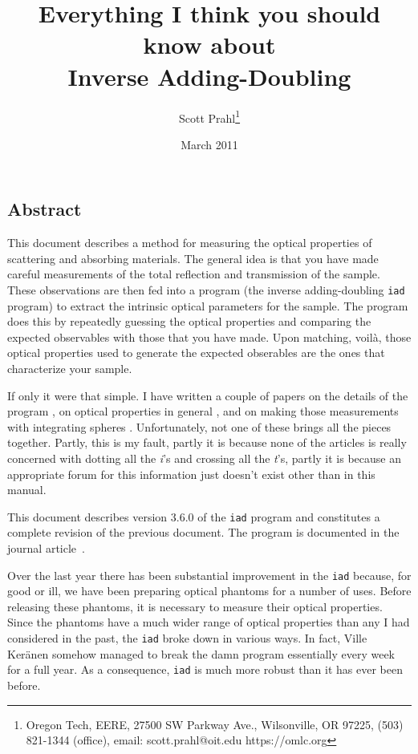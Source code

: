 \documentclass{article}
\newcommand\iadprog{\texttt{iad}}
\begin{document}
\title{Everything I think you should know about \\
Inverse Adding-Doubling}
\author{
	Scott Prahl\thanks{Oregon Tech,
	            EERE,
	            27500 SW Parkway Ave.,
	            Wilsonville, OR 97225,
	            (503) 821-1344 (office),
	            email: scott.prahl@oit.edu
	            https://omlc.org}	
}
\date{March 2011}	

\maketitle

\subsection*{Abstract}  
This document describes a method for measuring the optical properties of
scattering and absorbing materials.  The general idea is that you have made 
careful measurements of the total
reflection and transmission of the sample.  These observations are then fed into
a program (the inverse adding-doubling \iadprog{} program) to extract the intrinsic
optical parameters for the sample.   The program does this by repeatedly guessing
the optical properties and comparing the expected observables with those that you
have made.  Upon matching, voil\`a, those optical properties used to generate the
expected obserables are the ones that characterize your sample.

If only it were that simple.  I have written a couple of papers on the details of
the program \cite{jacques87a,prahl93a,moffitt06a}, on optical properties in general
\cite{cheong90a}, and on making those measurements with integrating spheres
\cite{pickering92,pickering93a}.  Unfortunately, not one of these brings all the
pieces together.  Partly, this is my fault, partly it is because none of the
articles is really concerned with dotting all the \textit{i}'s and crossing all
the \textit{t}'s, partly it is because an appropriate forum for this information
just doesn't exist other than in this manual.

This document describes version 3.6.0 of the \iadprog{} program and constitutes
a complete revision of the previous document.  The program is documented in the
journal article~\cite{moffitt07a}.

Over the last year there has been substantial improvement in the \iadprog{} because,
for good or ill, we have been preparing optical phantoms for a number of uses.
Before releasing these phantoms, it is necessary to measure their optical properties.
Since the phantoms have a much wider range of optical properties than any I had
considered in the past, the \iadprog{} broke down in various ways.  In fact, Ville
Ker{\"a}nen somehow managed to break the damn program essentially every week for a
full year.  As a consequence, \iadprog{} is much more robust than it has ever been before.
\end{document}

